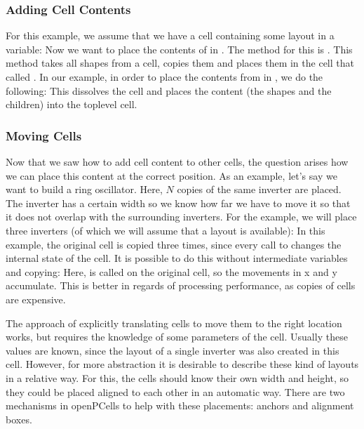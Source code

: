 \subsubsection{Adding Cell Contents}
For this example, we assume that we have a cell containing some layout in a variable:
Now we want to place the contents of  in .
The method for this is .
This method takes all shapes from a cell, copies them and places them in the cell that called .
In our example, in order to place the contents from  in , we do the following:
This dissolves the cell and places the content (the shapes and the children) into the toplevel cell.

\subsubsection{Moving Cells}
Now that we saw how to add cell content to other cells, the question arises how we can place this content at the correct position.
As an example, let's say we want to build a ring oscillator.
Here, $N$ copies of the same inverter are placed.
The inverter has a certain width so we know how far we have to move it so that it does not overlap with the surrounding inverters.
For the example, we will place three inverters (of which we will assume that a layout is available):
In this example, the original cell is copied three times, since every call to  changes the internal state of the cell.
It is possible to do this without intermediate variables and copying:
Here,  is called on the original cell, so the movements in x and y accumulate.
This is better in regards of processing performance, as copies of cells are expensive.

The approach of explicitly translating cells to move them to the right location works, but requires the knowledge of some parameters of the cell.
Usually these values are known, since the layout of a single inverter was also created in this cell.
However, for more abstraction it is desirable to describe these kind of layouts in a relative way.
For this, the cells should know their own width and height, so they could be placed aligned to each other in an automatic way.
There are two mechanisms in openPCells to help with these placements: anchors and alignment boxes.

